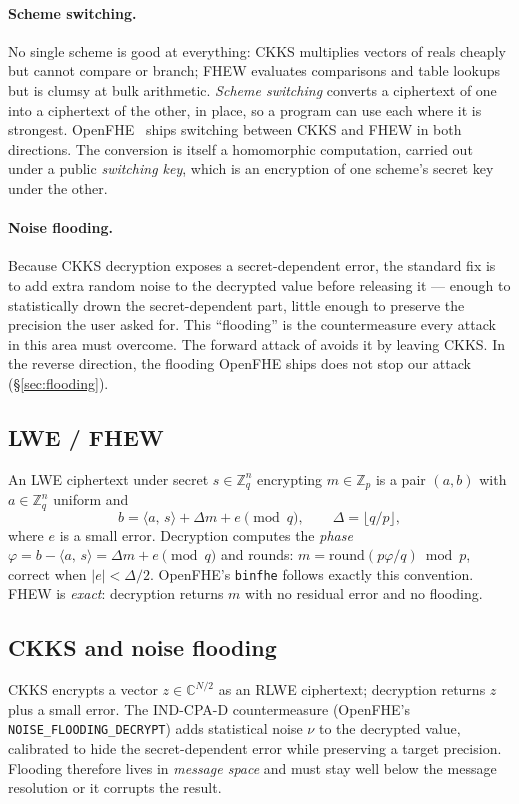 \documentclass[11pt]{article}
\newcommand{\inner}[2]{\langle #1,\, #2\rangle}
\newcommand{\Z}{\mathbb{Z}}
\newcommand{\code}[1]{\texttt{#1}}
\begin{document}
\paragraph{Scheme switching.}
No single scheme is good at everything: CKKS multiplies vectors of reals cheaply but cannot compare
or branch; FHEW evaluates comparisons and table lookups but is clumsy at bulk arithmetic.
\emph{Scheme switching} converts a ciphertext of one into a ciphertext of the other, in place, so a
program can use each where it is strongest. OpenFHE~\cite{openfhe} ships switching between CKKS and
FHEW in both directions. The conversion is itself a homomorphic computation, carried out under a
public \emph{switching key}, which is an encryption of
one scheme's secret key under the other.

\paragraph{Noise flooding.}
Because CKKS decryption exposes a secret-dependent error, the standard fix is to add extra random
noise to the decrypted value before releasing it --- enough to statistically drown the
secret-dependent part, little enough to preserve the precision the user asked for. This
``flooding'' is the countermeasure every attack in this area must overcome. The forward attack of
\citeauthor{santato2026} avoids it by leaving CKKS. In the reverse direction, the flooding OpenFHE
ships does not stop our attack (\S\ref{sec:flooding}).

\subsection{LWE / FHEW}
An LWE ciphertext under secret $s \in \Z_q^n$ encrypting $m \in \Z_p$ is a pair $(a, b)$ with
$a \in \Z_q^n$ uniform and
\[
  b = \inner{a}{s} + \Delta m + e \pmod q, \qquad \Delta = \lfloor q/p \rfloor,
\]
where $e$ is a small error. Decryption computes the \emph{phase}
$\varphi = b - \inner{a}{s} = \Delta m + e \pmod q$ and rounds:
$m = \mathrm{round}(p\varphi/q) \bmod p$, correct when $|e| < \Delta/2$. OpenFHE's \code{binfhe}
follows exactly this convention. FHEW is \emph{exact}: decryption returns $m$ with no residual
error and no flooding.

\subsection{CKKS and noise flooding}
CKKS encrypts a vector $z \in \mathbb{C}^{N/2}$ as an RLWE ciphertext; decryption returns $z$ plus
a small error. The IND-CPA-D countermeasure (OpenFHE's \code{NOISE\_FLOODING\_DECRYPT}) adds
statistical noise $\nu$ to the decrypted value, calibrated to hide the secret-dependent error
while preserving a target precision. Flooding therefore lives in \emph{message space} and must
stay well below the message resolution or it corrupts the result.
\end{document}
